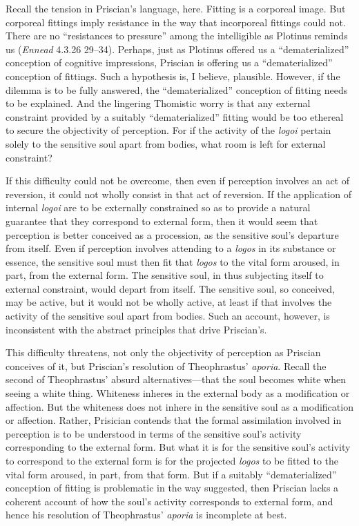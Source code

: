 \documentclass[12pt]{article}
\begin{document}
Recall the tension in Priscian's language, here. Fitting is a corporeal image. But corporeal fittings imply resistance in the way that incorporeal fittings could not. There are no ``resistances to pressure'' among the intelligible as Plotinus reminds us (\emph{Ennead} 4.3.26 29--34). Perhaps, just as Plotinus offered us a ``dematerialized'' conception of cognitive impressions, Priscian is offering us a ``dematerialized'' conception of fittings. Such a hypothesis is, I believe, plausible. However, if the dilemma is to be fully answered, the ``dematerialized'' conception of fitting needs to be explained. And the lingering Thomistic worry is that any external constraint provided by a suitably ``dematerialized'' fitting would be too ethereal to secure the objectivity of perception. For if the activity of the \emph{logoi} pertain solely to the sensitive soul apart from bodies, what room is left for external constraint? 

If this difficulty could not be overcome, then even if perception involves an act of reversion, it could not wholly consist in that act of reversion. If the application of internal \emph{logoi} are to be externally constrained so as to provide a natural guarantee that they correspond to external form, then it would seem that perception is better conceived as a procession, as the sensitive soul's departure from itself. Even if perception involves attending to a \emph{logos} in its substance or essence, the sensitive soul must then fit that \emph{logos} to the vital form aroused, in part, from the external form. The sensitive soul, in thus subjecting itself to external constraint, would depart from itself. The sensitive soul, so conceived, may be active, but it would not be wholly active, at least if that involves the activity of the sensitive soul apart from bodies. Such an account, however, is inconsistent with the abstract principles that drive Priscian's.

This difficulty threatens, not only the objectivity of perception as Priscian conceives of it, but Priscian's resolution of Theophrastus' \emph{aporia}. Recall the second of Theophrastus' absurd alternatives---that the soul becomes white when seeing a white thing. Whiteness inheres in the external body as a modification or affection. But the whiteness does not inhere in the sensitive soul as a modification or affection. Rather, Prisician contends that the formal assimilation involved in perception is to be understood in terms of the sensitive soul's activity corresponding to the external form. But what it is for the sensitive soul's activity to correspond to the external form is for the projected \emph{logos} to be fitted to the vital form aroused, in part, from that form. But if a suitably ``dematerialized'' conception of fitting is problematic in the way suggested, then Priscian lacks a coherent account of how the soul's activity corresponds to external form, and hence his resolution of Theophrastus' \emph{aporia} is incomplete at best.






\end{document}
